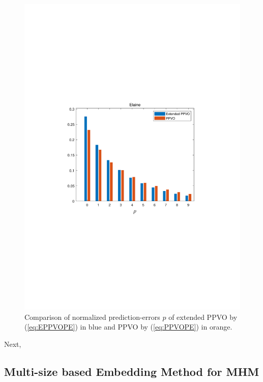 \documentclass[review,3p,10pt,sort&compress]{elsarticle}
\begin{document}
\begin{figure}
{\begin{minipage}[t]{0.225\linewidth}
    \includegraphics[width=1\textwidth]{figures/Comparison/elaine.pdf}
    \end{minipage}
}
\centering
\caption{Comparison of normalized prediction-errors $p$ of extended PPVO by (\ref{eq:EPPVOPE}) in blue and PPVO by (\ref{eq:PPVOPE}) in orange.}
\label{Fig.ComparisonEPPVO}
\end{figure}


Next, 


\subsection{Multi-size based Embedding Method for MHM}\label{sec:3.2}

\end{document}

